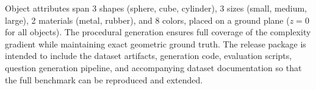 Object attributes span 3 shapes (sphere, cube, cylinder), 3 sizes (small, medium, large), 2 materials (metal, rubber), and 8 colors, placed on a ground plane ($z = 0$ for all objects). The procedural generation ensures full coverage of the complexity gradient while maintaining exact geometric ground truth. The release package is intended to include the dataset artifacts, generation code, evaluation scripts, question generation pipeline, and accompanying dataset documentation so that the full benchmark can be reproduced and extended.
